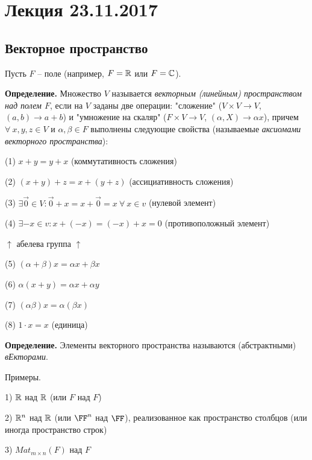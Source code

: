 \section{Лекция 23.11.2017}

\subsection{Векторное пространство}

\vspace{\baselineskip}
Пусть $F$ -- поле (например, $F = \mathbb{R}$ или $F = \mathbb{C}$).

\vspace{\baselineskip}
\textbf{Определение.} Множество $V$ называется \textit{векторным (линейным) пространством над полем $F$}, если на $V$ заданы две операции: "сложение" ($V \times V \rightarrow V$, $(a,b) \rightarrow a+b$) и "умножение на скаляр" ($F \times V \rightarrow V$, $(\alpha, X) \rightarrow \alpha x$), причем $\forall \ x, y, z \in V$ и $\alpha, \beta \in F$ выполнены следующие свойства (называемые \textit{аксиомами векторного пространства}):

(1) $x + y = y + x$ (коммутативность сложения)

(2) $(x+y)+z = x+(y+z)$ (ассициативность сложения)

(3) $\exists \overrightarrow{0} \in V: \overrightarrow{0} + x = x + \overrightarrow{0} = x \ \forall \ x \in v$ (нулевой элемент)

(4) $\exists -x \in v: x+(-x)=(-x)+x=0$ (противоположный элемент)

$\uparrow$ абелева группа $\uparrow$

(5) $(\alpha + \beta) x = \alpha x + \beta x$

(6) $\alpha (x + y) = \alpha x + \alpha y$

(7) $(\alpha \beta) x  = \alpha (\beta x)$

(8) $ 1 \cdot x = x $ (единица)

\vspace{\baselineskip}
\textbf{Определение.} Элементы векторного пространства называются (абстрактными) \textit{вЕкторами}.

\vspace{\baselineskip}
Примеры. 

1) $\mathbb{R}$ над $\mathbb{R}$ (или $F$ над $F$)

2) $\mathbb{R}^n$ над $\mathbb{R}$ (или $\FF^n$ над $\FF$), реализованное как пространство столбцов (или иногда пространство строк)

3) $Mat_{m \times n} (F)$ над $F$


